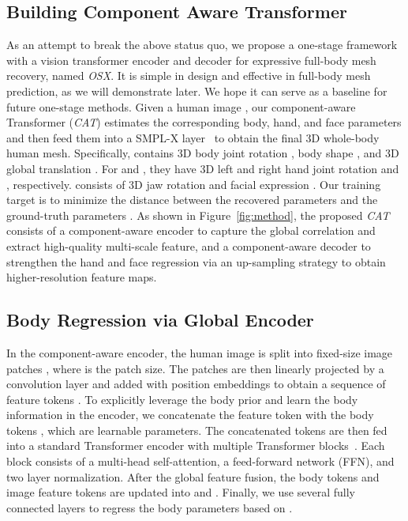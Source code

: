 \documentclass[10pt,twocolumn,letterpaper]{article}
\newcommand{\modelname}{\emph{OSX}\xspace}
\begin{document}
\subsection{Building Component Aware Transformer}
\label{sec:method_1}

 As an attempt to break the above status quo, we propose a one-stage framework with a vision transformer encoder and decoder for expressive full-body mesh recovery, named \modelname. It is simple in design and effective in full-body mesh prediction, as we will demonstrate later. We hope it can serve as a baseline for future one-stage methods.
Given a human image , our component-aware Transformer (\emph{CAT}) estimates the corresponding body, hand, and face parameters  and then feed them into a SMPL-X layer~\cite{Pavlakos_2019smplx} to obtain the final 3D whole-body human mesh. 
Specifically,  contains 3D body joint rotation , body shape , and 3D global translation . For  and , they have 3D left and right hand joint rotation  and , respectively. 
 consists of 3D jaw rotation  and facial expression .
Our training target is to minimize the distance between the recovered parameters  and the ground-truth parameters . As shown in Figure~\ref{fig:method}, the proposed \emph{CAT} consists of a component-aware encoder to capture the global correlation and extract high-quality multi-scale feature, and a component-aware decoder to strengthen the hand and face regression via an up-sampling strategy to obtain higher-resolution feature maps.

\subsection{Body Regression via Global Encoder}
\label{sec:method_2}
In the component-aware encoder, the human image  is split into fixed-size image patches , where  is the patch size. The patches  are then linearly projected by a convolution layer and added with position embeddings  to obtain a sequence of feature tokens .
To explicitly leverage the body prior and learn the body information in the encoder, we concatenate the feature token  with the body tokens , which are learnable parameters. The concatenated tokens are then fed into a standard Transformer encoder with multiple Transformer blocks~\cite{dosovitskiy2020vit}. Each block consists of a multi-head self-attention, a feed-forward network (FFN), and two layer normalization. 
After the global feature fusion, the body tokens and image feature tokens are updated into  and  . Finally, we use several fully connected layers to regress the body parameters  based on .
\end{document}
